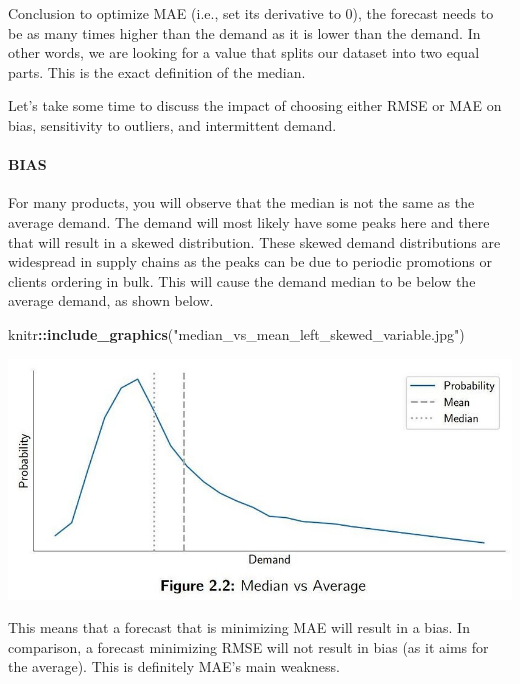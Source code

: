 \documentclass[
]{article}
\newenvironment{Shaded}{\begin{snugshade}}{\end{snugshade}}
\newcommand{\FunctionTok}[1]{\textcolor[rgb]{0.13,0.29,0.53}{\textbf{#1}}}
\newcommand{\NormalTok}[1]{#1}
\newcommand{\SpecialCharTok}[1]{\textcolor[rgb]{0.81,0.36,0.00}{\textbf{#1}}}
\newcommand{\StringTok}[1]{\textcolor[rgb]{0.31,0.60,0.02}{#1}}
\begin{document}
Conclusion to optimize MAE (i.e., set its derivative to 0), the forecast
needs to be as many times higher than the demand as it is lower than the
demand. In other words, we are looking for a value that splits our
dataset into two equal parts. This is the exact definition of the
median.

Let's take some time to discuss the impact of choosing either RMSE or
MAE on bias, sensitivity to outliers, and intermittent demand.

\hypertarget{bias}{%
\paragraph{BIAS}\label{bias}}

For many products, you will observe that the median is not the same as
the average demand. The demand will most likely have some peaks here and
there that will result in a skewed distribution. These skewed demand
distributions are widespread in supply chains as the peaks can be due to
periodic promotions or clients ordering in bulk. This will cause the
demand median to be below the average demand, as shown below.

\begin{Shaded}
\begin{Highlighting}[]
\NormalTok{knitr}\SpecialCharTok{::}\FunctionTok{include\_graphics}\NormalTok{(}\StringTok{"median\_vs\_mean\_left\_skewed\_variable.jpg"}\NormalTok{)}
\end{Highlighting}
\end{Shaded}

\includegraphics{median_vs_mean_left_skewed_variable.jpg}

This means that a forecast that is minimizing MAE will result in a bias.
In comparison, a forecast minimizing RMSE will not result in bias (as it
aims for the average). This is definitely MAE's main weakness.
\end{document}
